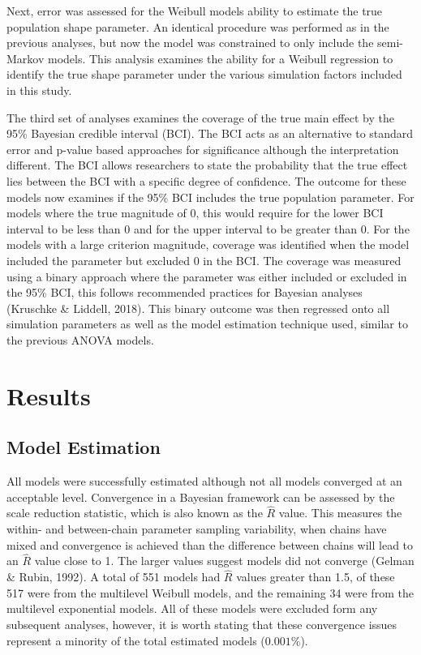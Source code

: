 \documentclass[12pt]{./styles/outhesis}
\begin{document}
Next, error was assessed for the Weibull models ability to estimate the
true population shape parameter. An identical procedure was performed as
in the previous analyses, but now the model was constrained to only
include the semi-Markov models. This analysis examines the ability for a
Weibull regression to identify the true shape parameter under the
various simulation factors included in this study.

The third set of analyses examines the coverage of the true main effect
by the 95\% Bayesian credible interval (BCI). The BCI acts as an
alternative to standard error and p-value based approaches for
significance although the interpretation different. The BCI allows
researchers to state the probability that the true effect lies between
the BCI with a specific degree of confidence. The outcome for these
models now examines if the 95\% BCI includes the true population
parameter. For models where the true magnitude of 0, this would require
for the lower BCI interval to be less than 0 and for the upper interval
to be greater than 0. For the models with a large criterion magnitude,
coverage was identified when the model included the parameter but
excluded 0 in the BCI. The coverage was measured using a binary approach
where the parameter was either included or excluded in the 95\% BCI,
this follows recommended practices for Bayesian analyses (Kruschke \&
Liddell, 2018). This binary outcome was then regressed onto all
simulation parameters as well as the model estimation technique used,
similar to the previous ANOVA models.

\section{Results}\label{results}
\subsection{Model Estimation}
All models were successfully estimated although not all models converged
at an acceptable level. Convergence in a Bayesian framework can be
assessed by the scale reduction statistic, which is also known as the
\(\hat{R}\) value. This measures the within- and between-chain parameter
sampling variability, when chains have mixed and convergence is achieved
than the difference between chains will lead to an \(\hat{R}\) value
close to 1. The larger values suggest models did not converge (Gelman \&
Rubin, 1992). A total of 551 models had \(\hat{R}\) values greater than
1.5, of these 517 were from the multilevel Weibull models, and the
remaining 34 were from the multilevel exponential models. All of these
models were excluded form any subsequent analyses, however, it is worth
stating that these convergence issues represent a minority of the total
estimated models (\(0.001\%\)).
\end{document}
